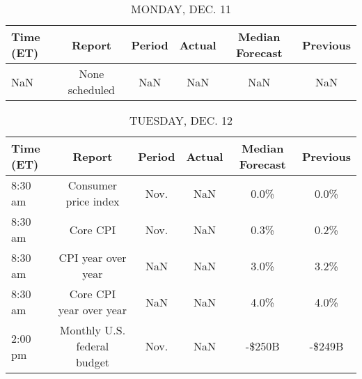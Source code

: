 \documentclass{article}%
\begin{document}
%
\normalsize%


\begin{table}[htbp]%
\caption{MONDAY, DEC. 11}%
\centering%
\begin{adjustbox}{width=1\textwidth}%
\begin{tabular}{lccccc}
\toprule
Time (ET) &         Report & Period & Actual & Median Forecast & Previous \\
\midrule
      NaN & None scheduled &    NaN &    NaN &             NaN &      NaN \\
\bottomrule
\end{tabular}
%
\end{adjustbox}%
\end{table}

%


\begin{table}[htbp]%
\caption{TUESDAY, DEC. 12}%
\centering%
\begin{adjustbox}{width=1\textwidth}%
\begin{tabular}{lccccc}
\toprule
Time (ET) &                      Report & Period & Actual & Median Forecast & Previous \\
\midrule
  8:30 am &        Consumer price index &   Nov. &    NaN &            0.0\% &     0.0\% \\
  8:30 am &                    Core CPI &   Nov. &    NaN &            0.3\% &     0.2\% \\
  8:30 am &          CPI year over year &    NaN &    NaN &            3.0\% &     3.2\% \\
  8:30 am &     Core CPI year over year &    NaN &    NaN &            4.0\% &     4.0\% \\
  2:00 pm & Monthly U.S. federal budget &   Nov. &    NaN &          -\$250B &   -\$249B \\
\bottomrule
\end{tabular}
%
\end{adjustbox}%
\end{table}

%
\end{document}
